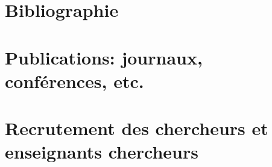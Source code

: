 \documentclass[a4paper,10pt]{book_ad}
\begin{document}
\chapter{Bibliographie}
\minitoc



\chapter{Publications: journaux, conférences, etc.}
\minitoc



\chapter{Recrutement des chercheurs et enseignants chercheurs}
\minitoc



\appendix



\printnomenclature
\clearpage

%

\end{document}
